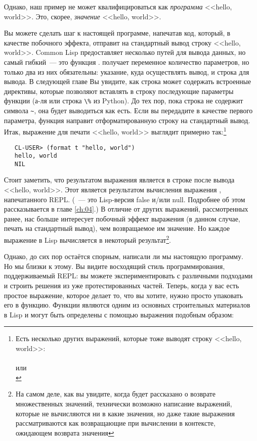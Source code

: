 Однако, наш пример не может квалифицироваться как \emph{программа} <<hello, world>>.
Это, скорее, \emph{значение} <<hello, world>>.

Вы можете сделать шаг к настоящей программе, напечатав код, который, в качестве побочного
эффекта, отправит на стандартный вывод строку <<hello, world>>. Common Lisp предоставляет
несколько путей для вывода данных, но самый гибкий~--- это функция .  получает
переменное количество параметров, но только два из них обязательны: указание, куда
осуществлять вывод, и строка для вывода. В следующей главе Вы увидите, как строка может
содержать встроенные директивы, которые позволяют вставлять в строку последующие параметры
функции (а-ля  или строка \lstinline|\%| из Python). До тех пор, пока строка
не содержит символа \lstinline|~|, она будет выводиться как есть. Если вы передадите  в
качестве первого параметра, функция  направит отформатированную строку на
стандартный вывод. Итак, выражение  для печати <<hello, world>> выглядит примерно
так:\footnote{Есть несколько других выражений, которые тоже выводят строку <<hello, world>>:\\
   \\
  или \\
  }

\begin{verbatim}
   CL-USER> (format t "hello, world")
   hello, world
   NIL
\end{verbatim}

Стоит заметить, что результатом выражения  является  в строке после
вывода <<hello, world>>. Этот  является результатом вычисления выражения ,
напечатанного REPL. (~--- это Lisp-версия false и/или null. Подробнее об этом
рассказывается в главе \ref{ch:04}.) В отличие от других выражений, рассмотренных ранее, нас больше
интересует побочный эффект выражения  (в данном случае, печать на стандартный
вывод), чем возвращаемое им значение. Но каждое выражение в Lisp вычисляется в некоторый
результат\footnote{На самом деле, как вы увидите, когда будет рассказано о возврате
  множественных значений, технически возможно написание выражений, которые не вычисляются
  ни в какие значения, но даже такие выражения рассматриваются как возвращающие  при
  вычислении в контексте, ожидающем возврата значения}.

Однако, до сих пор остаётся спорным, написали ли мы настоящую программу. Но мы близки к этому.
Вы видите восходящий стиль программирования, поддерживаемый REPL: вы можете
экспериментировать с различными подходами и строить решения из уже протестированных
частей. Теперь, когда у вас есть простое выражение, которое делает то, что вы хотите,
нужно просто упаковать его в функцию. Функции являются одним из основных строительных
материалов в Lisp и могут быть определены с помощью выражения  подобным образом:

